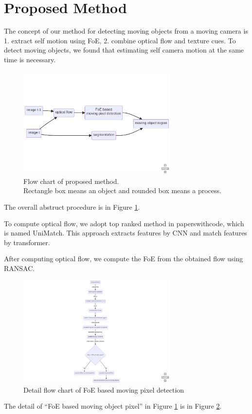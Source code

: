 \documentclass[10pt, twocolumn]{article}
\begin{document}
\section{Proposed Method}
The concept of our method for detecting moving objects from a moving camera is 1. extract self motion using FoE, 2. combine optical flow and texture cues.
To detect moving objects, we found that estimating self camera motion at the same time is necessary.
\begin{figure}[ht]
  \centering
  \includegraphics[width=8cm]{fig/wholeflow.png}
  \caption{Flow chart of proposed method.\\
    Rectangle box means an object and rounded box means a process.}
  \label{fig:wholeflow}
\end{figure}
The overall abstruct procedure is in Figure \ref{fig:wholeflow}.

To compute optical flow, we adopt top ranked method in paperswithcode, which is named UniMatch\cite{xu2022unifying}.
This approach extracts features by CNN and match features by transformer.

After computing optical flow, we compute the FoE from the obtained flow using RANSAC.
\begin{figure}[ht]
  \centering
  \includegraphics[width=8cm]{fig/foeflow.png}
  \caption{Detail flow chart of FoE based moving pixel detection}
  \label{fig:foeflow}
\end{figure}
The detail of ``FoE based moving object pixel'' in Figure \ref{fig:wholeflow} is in Figure \ref{fig:foeflow}.
\end{document}
